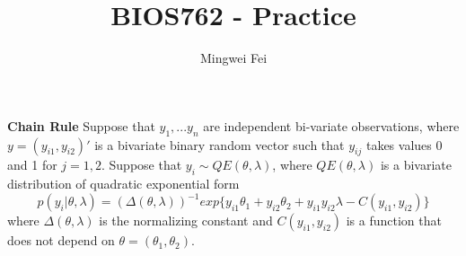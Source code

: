 \documentclass{homework}
\title{BIOS762 - Practice}
\author{Mingwei Fei}
\begin{document}
\maketitle

\exercise
\textbf{Chain Rule} Suppose that $y_1, ... y_n$ are independent bi-variate observations, where $y=(y_{i1}, y_{i2})'$ is a bivariate binary random vector such that $y_{ij}$ takes values 0 and 1 for $j=1,2$. Suppose that $y_i \sim QE(\theta, \lambda)$, where $QE(\theta, \lambda)$ is a bivariate distribution of quadratic exponential form 
\[
        p(y_i|\theta, \lambda) = (\Delta(\theta, \lambda))^{-1} exp\{y_{i1}\theta_1 + y_{i2}\theta_2 + y_{i1}y_{i2}\lambda - C(y_{i1},y_{i2})\}
    \]
where $\Delta(\theta, \lambda)$ is the normalizing constant and $C(y_{i1},y_{i2})$ is a function that does not depend on $\theta=(\theta_1, \theta_2)$.
\end{document}
